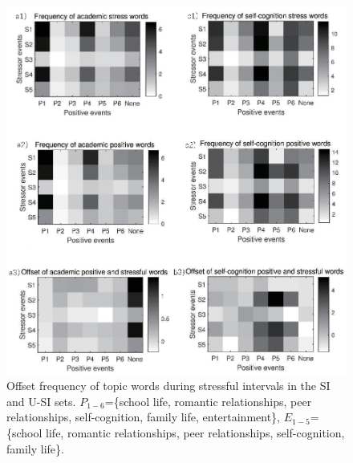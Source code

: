  \begin{figure}[h]
\centering
\includegraphics[width=\linewidth]{figs/gray/topicOffset.eps}
\caption{\small{Offset frequency of topic words during stressful intervals in the SI and U-SI sets.
$P_{1-6}$=\{school life, romantic relationships, peer relationships, self-cognition, family life, entertainment\},
$E_{1-5}$=\{school life, romantic relationships, peer relationships, self-cognition, family life\}.}}
\label{fig:stopic}
\end{figure}

